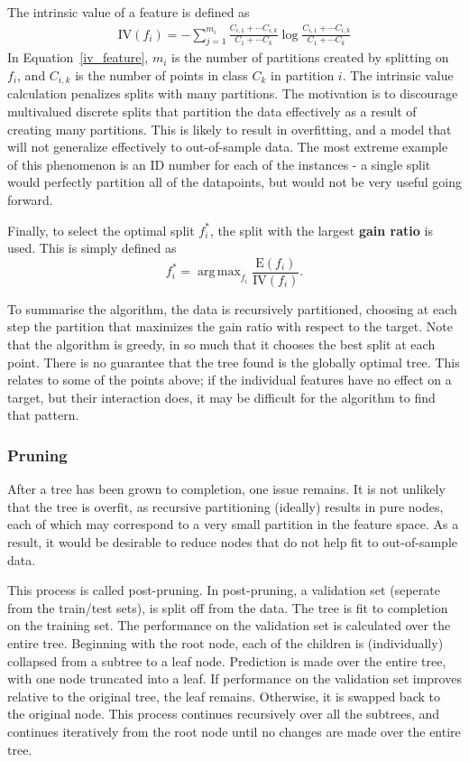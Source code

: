 \documentclass{amsart}
\DeclareMathOperator*{\argmax}{arg\,max}
\begin{document}
    The intrinsic value of a feature is defined as
    \begin{align}
        \textrm{IV}(f_i) = -\sum_{j=1}^{m_i} \frac{C_{i, 1} + \cdots C_{i, k}}
        {C_{1} + \cdots C_{k}} \log  \frac{C_{i, 1} + \cdots C_{i, k}}
        {C_{1} + \cdots C_{k}}
    \label{iv_feature}
    \end{align}
    In Equation~\ref{iv_feature}, $m_i$ is the number of partitions created by splitting
    on $f_i$, and $C_{i, k}$ is the number of points in class $C_k$ in partition $i$.
    The intrinsic value calculation penalizes splits with many partitions. The
    motivation is to discourage multivalued discrete splits that
    partition the data effectively as a result of creating many partitions. This is
    likely to result in overfitting, and a model that will not generalize effectively
    to out-of-sample data. The most extreme example of this phenomenon is an ID number
    for each of the instances - a single split would perfectly partition all of the
    datapoints, but would not be very useful going forward.

    Finally, to select the optimal split $f_i^*$, the split with the largest \textbf{gain ratio}
    is used. This is simply defined as
    \[
        f_i^* = \argmax_{f_i} \frac{\textrm{E}(f_i)}{\textrm{IV}(f_i)}.
    \]

    To summarise the algorithm, the data is recursively partitioned, choosing at each step
    the partition that maximizes the gain ratio with respect to the target. Note that
    the algorithm is greedy, in so much that it chooses the best split at each point.
    There is no guarantee that the tree found is the globally optimal tree. This relates
    to some of the points above; if the individual features have no effect on
    a target, but their interaction does, it may be difficult for the algorithm to
    find that pattern.

    \subsubsection{Pruning}
    After a tree has been grown to completion, one issue remains. It is not unlikely that the tree is overfit,
    as recursive partitioning (ideally) results in pure nodes, each of which may correspond to a
    very small partition in the feature space. As a result, it would be desirable to reduce nodes that
    do not help fit to out-of-sample data.

    This process is called post-pruning\cite{textbook}.
    In post-pruning, a validation set (seperate from the train/test sets),
    is split off from the data. The tree is fit to completion on the training set.
    The performance on the validation set is calculated over the entire tree.
    Beginning with the root node,
    each of the children is (individually) collapsed from a subtree to a leaf node. Prediction
    is made over the entire tree, with one node truncated into a leaf. If performance
    on the validation set improves relative to the original tree, the leaf remains. Otherwise,
    it is swapped back to the original node. This process continues recursively over all the subtrees,
    and continues iteratively from the root node until no changes are made over the entire tree.
\end{document}
